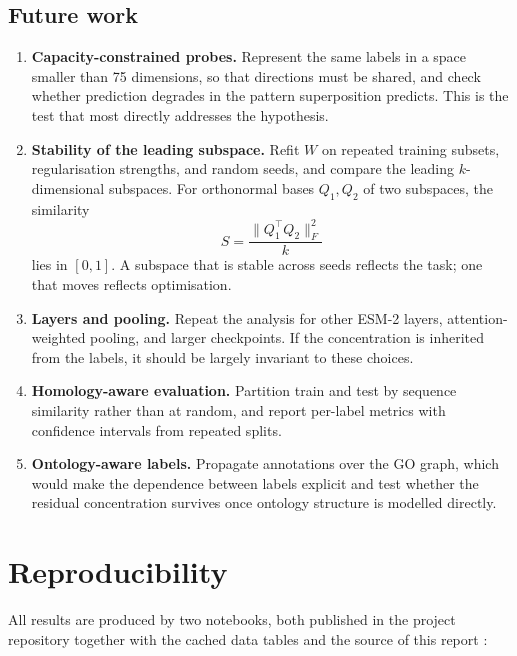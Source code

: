 \documentclass[11pt,a4paper]{article}
\begin{document}
\subsection{Future work}

\begin{enumerate}[leftmargin=*]
    \item \textbf{Capacity-constrained probes.} Represent the same labels in a
    space smaller than 75 dimensions, so that directions must be shared, and check
    whether prediction degrades in the pattern superposition predicts. This is the
    test that most directly addresses the hypothesis.

    \item \textbf{Stability of the leading subspace.} Refit $W$ on repeated
    training subsets, regularisation strengths, and random seeds, and compare the
    leading $k$-dimensional subspaces. For orthonormal bases $Q_1, Q_2$ of two
    subspaces, the similarity
    \begin{equation}
        S = \frac{\lVert Q_1^\top Q_2 \rVert_F^2}{k}
    \end{equation}
    lies in $[0,1]$. A subspace that is stable across seeds reflects the task; one
    that moves reflects optimisation.

    \item \textbf{Layers and pooling.} Repeat the analysis for other ESM-2 layers,
    attention-weighted pooling, and larger checkpoints. If the concentration is
    inherited from the labels, it should be largely invariant to these choices.

    \item \textbf{Homology-aware evaluation.} Partition train and test by sequence
    similarity rather than at random, and report per-label metrics with confidence
    intervals from repeated splits.

    \item \textbf{Ontology-aware labels.} Propagate annotations over the GO
    graph, which would make the dependence between labels explicit and test
    whether the residual concentration survives once ontology structure is
    modelled directly.
\end{enumerate}

\section{Reproducibility}

All results are produced by two notebooks, both published in the project
repository together with the cached data tables and the source of this report
\cite{ruixi2026}:
\end{document}
